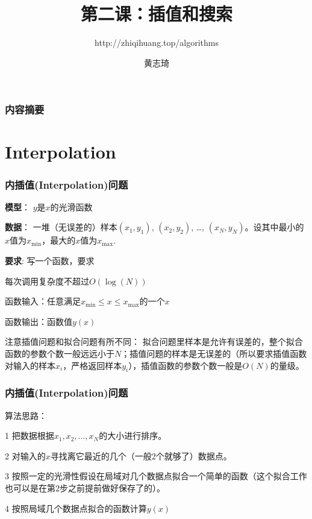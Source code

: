 \documentclass[CJK,14pt]{beamer}
\begin{document}
\bch

\title{第二课：插值和搜索}
\subtitle{http://zhiqihuang.top/algorithms}
  \author{黄志琦}
  \date{}

  \maketitle

  \begin{frame}
    \frametitle{内容摘要}
  \tableofcontents
  \end{frame}

  \section{Interpolation}

  \begin{frame}
    \frametitle{内插值(Interpolation)问题}
               {\bf 模型}： $y$是$x$的光滑函数
               
               {\bf 数据}： 一堆（无误差的）样本$(x_1,y_1)$, $(x_2, y_2)$, \ldots, $(x_N, y_N)$。设其中最小的$x$值为$x_{\min}$，最大的$x$值为$x_{\max}$.

               {\bf 要求}: 写一个函数，要求
               \bitem
               \item{每次调用复杂度不超过$O\left(\log(N)\right)$}
               
               \item{函数输入：任意满足$x_{\min}\le x\le x_{\max}$的一个$x$}
               
               \item{函数输出：函数值$y(x)$}
                 \eitem

注意插值问题和拟合问题有所不同： 拟合问题里样本是允许有误差的，整个拟合函数的参数个数一般远远小于$N$；插值问题的样本是无误差的（所以要求插值函数对输入的样本$x_i$，严格返回样本$y_i$），插值函数的参数个数一般是$O(N)$的量级。
  \end{frame}


  \begin{frame}
    \frametitle{内插值(Interpolation)问题}
    算法思路：
    \bitem
  \item[1]{把数据根据$x_1,x_2,\ldots, x_N$的大小进行排序。}
  \item[2]{对输入的$x$寻找离它最近的几个（一般2个就够了）数据点。}    
  \item[3]{按照一定的光滑性假设在局域对几个数据点拟合一个简单的函数（这个拟合工作也可以是在第2步之前提前做好保存了的）。}
  \item[4]{按照局域几个数据点拟合的函数计算$y(x)$}
    \eitem
  \end{frame}
\end{document}
